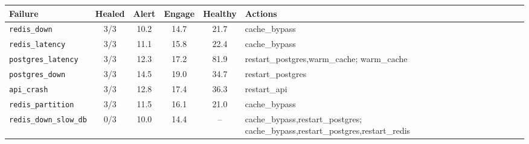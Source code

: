 \begin{tabular}{@{}lccccp{2.55cm}@{}}
\toprule
Failure & Healed & Alert & Engage & Healthy & Actions \\
\midrule
\texttt{redis\_down} & 3/3 & 10.2 & 14.7 & 21.7 & {\scriptsize cache\_bypass} \\
\texttt{redis\_latency} & 3/3 & 11.1 & 15.8 & 22.4 & {\scriptsize cache\_bypass} \\
\texttt{postgres\_latency} & 3/3 & 12.3 & 17.2 & 81.9 & {\scriptsize restart\_postgres,warm\_cache; warm\_cache} \\
\texttt{postgres\_down} & 3/3 & 14.5 & 19.0 & 34.7 & {\scriptsize restart\_postgres} \\
\texttt{api\_crash} & 3/3 & 12.8 & 17.4 & 36.3 & {\scriptsize restart\_api} \\
\midrule
\texttt{redis\_partition} & 3/3 & 11.5 & 16.1 & 21.0 & {\scriptsize cache\_bypass} \\
\texttt{redis\_down\_slow\_db} & 0/3 & 10.0 & 14.4 & -- & {\scriptsize cache\_bypass,restart\_postgres; cache\_bypass,restart\_postgres,restart\_redis} \\
\bottomrule
\end{tabular}